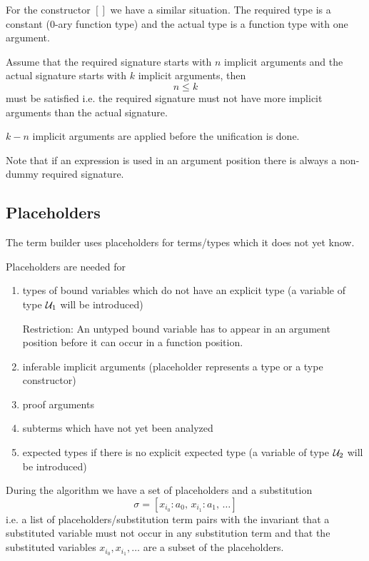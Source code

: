 For the constructor $[]$ we have a similar situation. The required type is a
constant (0-ary function type) and the actual type is a function type with one
argument.


Assume that the required signature starts with $n$ implicit arguments and the
actual signature starts with $k$ implicit arguments, then
$$
n \le k
$$
must be satisfied i.e. the required signature must not have more implicit
arguments than the actual signature.

$k - n$ implicit arguments are applied before the unification is done.

Note that if an expression is used in an argument position there is always a
non-dummy required signature.





\subsection{Placeholders}

The term builder uses placeholders for terms/types which it does not yet know.

Placeholders are needed for
%
\begin{enumerate}

\item types of bound variables which do not have an explicit type (a variable
  of type ${\cal{U}}_1$ will be introduced)

  Restriction: An untyped bound variable has to appear in an argument position
  before it can occur in a function position.

\item inferable implicit arguments (placeholder represents a type or a type
  constructor)

\item proof arguments

\item subterms which have not yet been analyzed

\item expected types if there is no explicit expected type (a variable of type
  ${\cal{U}}_2$ will be introduced)

\end{enumerate}



During the algorithm we have a set of placeholders and a substitution
$$
\sigma = [x_{i_0}: a_0,\, x_{i_1}: a_1,\, \ldots]
$$
i.e. a list of placeholders/substitution term pairs with the invariant that a
substituted variable must not occur in any substitution term and that the
substituted variables $x_{i_0}, x_{i_1}, \ldots$ are a subset of the
placeholders.





